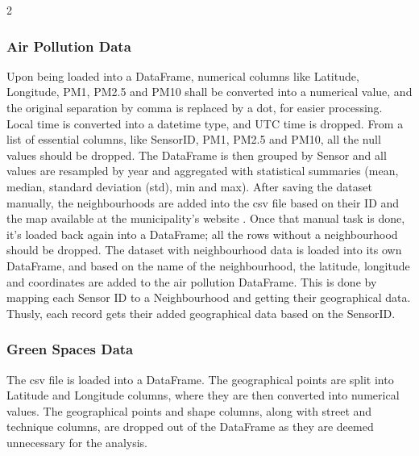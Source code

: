 \documentclass[12pt, a4paper]{article}
\begin{document}
\begin{multicols}{2}
    \subsubsection{Air Pollution Data}
    Upon being loaded into a DataFrame, numerical columns like Latitude, Longitude, PM1, PM2.5 and PM10 shall be converted into a numerical value, and the original separation by comma is replaced by a dot, for easier processing. Local time is converted into a datetime type, and UTC time is dropped.
    From a list of essential columns, like SensorID, PM1, PM2.5 and PM10, all the null values should be dropped. The DataFrame is then grouped by Sensor and all values are resampled by year and aggregated with statistical summaries (mean, median, standard deviation (std), min and max).
    After saving the dataset manually, the neighbourhoods are added into the csv file based on their ID and the map available at the municipality's website \cite{eindhoven_realtime_pm_data}. Once that manual task is done, it's loaded back again into a DataFrame; all the rows without a neighbourhood should be dropped. The dataset with neighbourhood data is loaded into its own DataFrame, and based on the name of the neighbourhood, the latitude, longitude and coordinates are added to the air pollution DataFrame. This is done by mapping each Sensor ID to a Neighbourhood and getting their geographical data. Thusly, each record gets their added geographical data based on the SensorID.
    \subsubsection{Green Spaces Data}
    The csv file is loaded into a DataFrame. The geographical points are split into Latitude and Longitude columns, where they are then converted into numerical values. The geographical points and shape columns, along with street and technique columns, are dropped out of the DataFrame as they are deemed unnecessary for the analysis.

\end{multicols}
\end{document}
